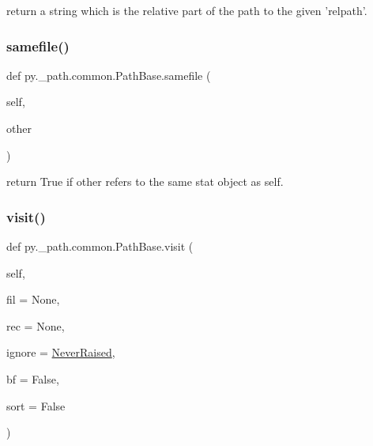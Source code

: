 \begin{DoxyVerb}return a string which is the relative part of the path
to the given 'relpath'.
\end{DoxyVerb}
 \mbox{\label{classpy_1_1__path_1_1common_1_1_path_base_a84210f2ec302ac39f3ac1ef5348471b8}} 
\subsubsection{\texorpdfstring{samefile()}{samefile()}}
{\footnotesize\ttfamily def py.\+\_\+path.\+common.\+Path\+Base.\+samefile (\begin{DoxyParamCaption}\item[{}]{self,  }\item[{}]{other }\end{DoxyParamCaption})}

\begin{DoxyVerb}return True if other refers to the same stat object as self. \end{DoxyVerb}
 \mbox{\label{classpy_1_1__path_1_1common_1_1_path_base_a0b741bae7d34c1ce321c11fb3939177f}} 
\subsubsection{\texorpdfstring{visit()}{visit()}}
{\footnotesize\ttfamily def py.\+\_\+path.\+common.\+Path\+Base.\+visit (\begin{DoxyParamCaption}\item[{}]{self,  }\item[{}]{fil = {\ttfamily None},  }\item[{}]{rec = {\ttfamily None},  }\item[{}]{ignore = {\ttfamily \hyperlink{classpy_1_1__path_1_1common_1_1_never_raised}{Never\+Raised}},  }\item[{}]{bf = {\ttfamily False},  }\item[{}]{sort = {\ttfamily False} }\end{DoxyParamCaption})}

